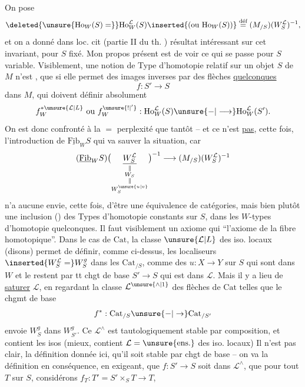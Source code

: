 On pose
\[
\deleted{\unsure{\mathrm{Ho}_W(S)=}}\mathrm{Ho}^{\mathcal L}_W(S)
\inserted{(\text{ou }\mathrm{Ho}_{W}(S))}
\overset{\text{déf}}{=}(M_{/S})(W_S^{\mathcal L})^{-1},
\]
et on a donné dans loc. cit (partie II du th. )   résultat intéressant sur cet invariant, pour $S$ fixé. Mon propos
présent est de voir ce qui se passe pour $S$ variable. Visiblement, une notion de Type d'homotopie relatif sur un objet  $S$ de $M$ n'est , que si elle permet des images inverses par des flèches \uline{quelconques}
\[
f:S'\longrightarrow S
\]
dans $M$, qui doivent définir absolument
\[
f^{*\unsure{\mathcal L|L}}_{W}\ \text{ou}\ f^{\unsure{!|'}}_{W}:
\mathrm{Ho}_{W}^{\mathcal L}(S)\unsure{-|\longrightarrow}\mathrm{Ho}_{W}^{\mathcal L}(S').
\]
On est donc confronté à la $=$ perplexité que tantôt -- et ce n'est \uline{pas}, cette fois, l'introduction de $\underline{\mathrm{Fib}}_W S$ qui va sauver la situation, car
\[
(\underline{\mathrm{Fib}}_W S)
\bigl(\underset{\substack{\Vert\\W_S\\\Vert\\W_S^{\unsure{u|v}}}}{\underline{W_S^{\mathcal L}}}\bigr)^{-1}
\longrightarrow (M_{/S})(W_S^{\mathcal L})^{-1}
\]
n'a aucune envie, cette fois, d'être une équivalence de catégories, mais bien plutôt une  inclusion () des Types d'homotopie  constants sur $S$, dans les $W$-types d'homotopie quelconques. Il faut visiblement un axiome qui   ``l'axiome  de la fibre homotopique''.
Dans le cas de $\mathrm{Cat}$, la classe $\unsure{\mathcal L|L}$ des iso. locaux (disons) permet de définir, comme ci-dessus, les localiseurs $\inserted{W_S^{\mathcal L}=}W_S^g$ dans les $\mathrm{Cat}_{/S}$, comme  des $u:X\to Y$ sur $S$ qui sont dans $W$ et le restent par tt chgt de base $S'\to S$ qui est dans $\mathcal L$.
Mais il y a lieu de \uline{saturer} $\mathcal L$, en regardant  la classe $\mathcal L^{\unsure{\wedge|1}}$ des flèches  de $\mathrm{Cat}$ telles que le chgmt de base
\[
f^*:\mathrm{Cat}_{/S}\unsure{-|\to}\mathrm{Cat}_{/S'}
\]
envoie $W_S^g$ dans $W_{S'}^g$. Ce $\mathcal L^{\wedge}$ est tautologiquement stable par composition, et contient les isos (mieux, contient $\mathcal L=\unsure{\text{ens.}}$ des iso. locaux) Il n'est pas clair,  la définition donnée ici, qu'il soit stable par chgt de base -- on va   la définition en conséquence, en exigeant,   que $f:S'\to S$ soit dans $\mathcal L^\wedge$, que pour tout $T$ sur $S$, considérons $f_T:T'=S'\times_S T\to T$,
